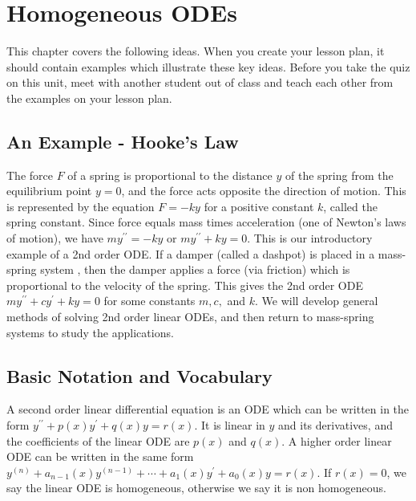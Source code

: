 
\chapter{Homogeneous ODEs}

\noindent  
This chapter covers the following ideas. When you create your lesson plan, it should contain examples which illustrate these key ideas. Before you take the quiz on this unit, meet with another student out of class and teach each other from the examples on your lesson plan. 









\section{An Example - Hooke's Law}
The force $F$ of a spring is proportional to the distance $y$ of the spring from the equilibrium point $y=0$, and the force acts opposite the direction of motion. This is represented by the equation $F=-ky$ for a positive constant $k$, called the spring constant.  Since force equals mass times acceleration (one of Newton's laws of motion), we have $my^{\prime\prime}=-ky$ or $my^{\prime\prime}+ky=0$. This is our introductory example of a 2nd order ODE.  If a damper (called a dashpot) is placed in a mass-spring system , then the damper applies a force (via friction) which is proportional to the velocity of the spring.  This gives the 2nd order ODE $my^{\prime\prime}+cy^\prime+ky=0$ for some constants $m,c,$ and $k$.  We will develop general methods of solving 2nd order linear ODEs, and then return to mass-spring systems to study the applications.

\section{Basic Notation and Vocabulary}
A second order linear differential equation is an ODE which can be written in the form $y^{\prime\prime}+p(x)y^\prime+q(x)y=r(x)$. It is linear in $y$ and its derivatives, and the coefficients of the linear ODE are $p(x)$ and $q(x)$.  A higher order linear ODE can be written in the same form $y^{(n)}+a_{n-1}(x)y^{(n-1)} + \cdots + a_1(x)y^\prime+a_0(x)y=r(x)$. If $r(x)=0$, we say the linear ODE is homogeneous, otherwise we say it is non homogeneous.

